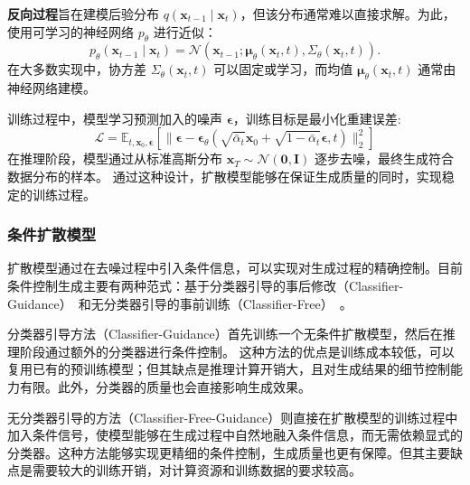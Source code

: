 \textbf{反向过程}旨在建模后验分布 $q(\mathbf{x}_{t-1} \mid \mathbf{x}_t)$，但该分布通常难以直接求解。为此，使用可学习的神经网络 $p_{\theta}$ 进行近似：
\begin{equation}
    p_{\theta}(\mathbf{x}_{t-1} \mid \mathbf{x}_t) = \mathcal{N}(\mathbf{x}_{t-1}; \boldsymbol{\mu}_{\theta}(\mathbf{x}_t, t), \Sigma_{\theta}(\mathbf{x}_t, t)).
\end{equation}
在大多数实现中，协方差 $\Sigma_{\theta}(\mathbf{x}_t, t)$ 可以固定或学习，而均值 $\boldsymbol{\mu}_{\theta}(\mathbf{x}_t, t)$ 通常由神经网络建模。

训练过程中，模型学习预测加入的噪声 $\boldsymbol{\epsilon}$，训练目标是最小化重建误差:
\begin{equation}
    \mathcal{L} = \mathbb{E}_{t,\mathbf{x}_0,\boldsymbol{\epsilon}}[\|\boldsymbol{\epsilon} - \boldsymbol{\epsilon}_\theta(\sqrt{\bar{\alpha}_t}\mathbf{x}_0 + \sqrt{1-\bar{\alpha}_t}\boldsymbol{\epsilon},t)\|_2^2]
\end{equation}
在推理阶段，模型通过从标准高斯分布 $\mathbf{x}_T \sim \mathcal{N}(\mathbf{0}, \mathbf{I})$ 逐步去噪，最终生成符合数据分布的样本。
通过这种设计，扩散模型能够在保证生成质量的同时，实现稳定的训练过程。


\subsubsection{条件扩散模型}
扩散模型通过在去噪过程中引入条件信息，可以实现对生成过程的精确控制。目前条件控制生成主要有两种范式：基于分类器引导的事后修改（Classifier-Guidance）~\cite{dhariwal2021diffusion}和无分类器引导的事前训练（Classifier-Free）~\cite{ho2022classifier}。

分类器引导方法（Classifier-Guidance）首先训练一个无条件扩散模型，然后在推理阶段通过额外的分类器进行条件控制。
这种方法的优点是训练成本较低，可以复用已有的预训练模型；但其缺点是推理计算开销大，且对生成结果的细节控制能力有限。此外，分类器的质量也会直接影响生成效果。

无分类器引导的方法（Classifier-Free-Guidance）则直接在扩散模型的训练过程中加入条件信号，使模型能够在生成过程中自然地融入条件信息，而无需依赖显式的分类器。这种方法能够实现更精细的条件控制，生成质量也更有保障。但其主要缺点是需要较大的训练开销，对计算资源和训练数据的要求较高。

